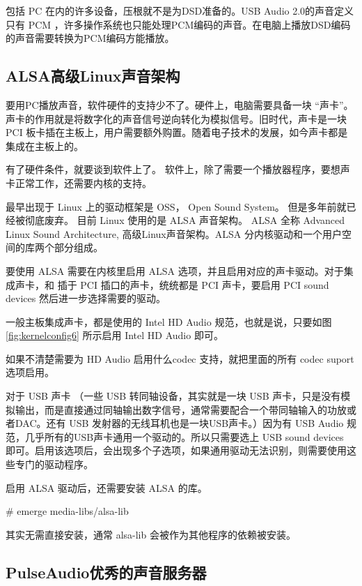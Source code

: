 包括 PC 在内的许多设备，压根就不是为DSD准备的。USB Audio 2.0的声音定义只有 PCM ，许多操作系统也只能处理PCM编码的声音。在电脑上播放DSD编码的声音需要转换为PCM编码方能播放。


\subsection{ALSA高级Linux声音架构}

要用PC播放声音，软件硬件的支持少不了。硬件上，电脑需要具备一块 “声卡”。声卡的作用就是将数字化的声音信号逆向转化为模拟信号。旧时代，声卡是一块 PCI 板卡插在主板上，用户需要额外购置。随着电子技术的发展，如今声卡都是集成在主板上的。

有了硬件条件，就要谈到软件上了。 软件上，除了需要一个播放器程序，要想声卡正常工作，还需要内核的支持。

最早出现于  Linux 上的驱动框架是 OSS， Open Sound System。  但是多年前就已经被彻底废弃。
目前 Linux 使用的是 ALSA 声音架构。 ALSA 全称 Advanced Linux Sound Architecture, 高级Linux声音架构。ALSA 分内核驱动和一个用户空间的库两个部分组成。


要使用 ALSA 需要在内核里启用 ALSA 选项，并且启用对应的声卡驱动。对于集成声卡，和 插于 PCI 插口的声卡，统统都是 PCI 声卡，要启用 PCI sound devices 然后进一步选择需要的驱动。

一般主板集成声卡，都是使用的 Intel HD Audio 规范，也就是说，只要如图 \ref{fig:kernelconfig6} 所示启用 Intel HD Audio 即可。


如果不清楚需要为 HD Audio 启用什么codec 支持，就把里面的所有 codec suport 选项启用。

对于 USB 声卡 （一些 USB 转同轴设备，其实就是一块 USB 声卡，只是没有模拟输出，而是直接通过同轴输出数字信号，通常需要配合一个带同轴输入的功放或者DAC。还有 USB 发射器的无线耳机也是一块USB声卡。）因为有 USB Audio 规范，几乎所有的USB声卡通用一个驱动的。所以只需要选上 USB sound devices 即可。启用该选项后，会出现多个子选项，如果通用驱动无法识别，则需要使用这些专门的驱动程序。

启用 ALSA 驱动后，还需要安装 ALSA 的库。

\begin{code}
\# emerge media-libs/alsa-lib
\end{code}

其实无需直接安装，通常 alsa-lib 会被作为其他程序的依赖被安装。

\subsection{PulseAudio优秀的声音服务器}


